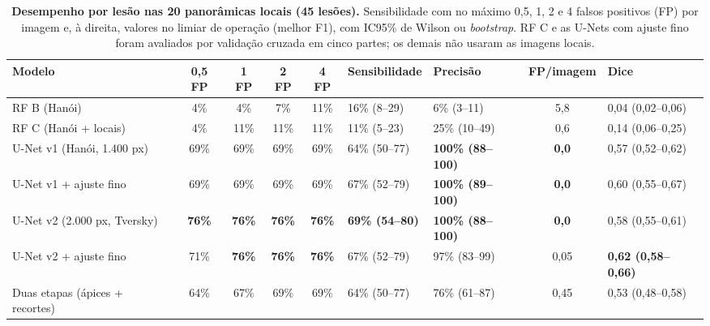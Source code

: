 \documentclass[twocolumn]{article}
\begin{document}

\begin{table}[!t]
\caption{\textbf{Desempenho por lesão nas 20 panorâmicas locais (45 lesões).} Sensibilidade com no máximo 0,5, 1, 2 e 4 falsos positivos (FP) por imagem e, à direita, valores no limiar de operação (melhor F1), com IC95\% de Wilson ou \textit{bootstrap}. RF C e as U-Nets com ajuste fino foram avaliados por validação cruzada em cinco partes; os demais não usaram as imagens locais.}
\centering\tablefont
\begin{tabularx}{\textwidth}{L *{4}{c} Y Y c Y}
\toprule
Modelo & 0,5 FP & 1 FP & 2 FP & 4 FP & Sensibilidade & Precisão & FP/imagem & Dice \\
\midrule
RF B (Hanói) & 4\% & 4\% & 7\% & 11\% & 16\% (8--29) & 6\% (3--11) & 5,8 & 0,04 (0,02--0,06) \\
RF C (Hanói + locais) & 4\% & 11\% & 11\% & 11\% & 11\% (5--23) & 25\% (10--49) & 0,6 & 0,14 (0,06--0,25) \\
U-Net v1 (Hanói, 1.400 px) & 69\% & 69\% & 69\% & 69\% & 64\% (50--77) & \textbf{100\% (88--100)} & \textbf{0,0} & 0,57 (0,52--0,62) \\
U-Net v1 + ajuste fino & 69\% & 69\% & 69\% & 69\% & 67\% (52--79) & \textbf{100\% (89--100)} & \textbf{0,0} & 0,60 (0,55--0,67) \\
U-Net v2 (2.000 px, Tversky) & \textbf{76\%} & \textbf{76\%} & \textbf{76\%} & \textbf{76\%} & \textbf{69\% (54--80)} & \textbf{100\% (88--100)} & \textbf{0,0} & 0,58 (0,55--0,61) \\
U-Net v2 + ajuste fino & 71\% & \textbf{76\%} & \textbf{76\%} & \textbf{76\%} & 67\% (52--79) & 97\% (83--99) & 0,05 & \textbf{0,62 (0,58--0,66)} \\
Duas etapas (ápices + recortes) & 64\% & 67\% & 69\% & 69\% & 64\% (50--77) & 76\% (61--87) & 0,45 & 0,53 (0,48--0,58) \\
\bottomrule
\end{tabularx}
\end{table}
\end{document}
